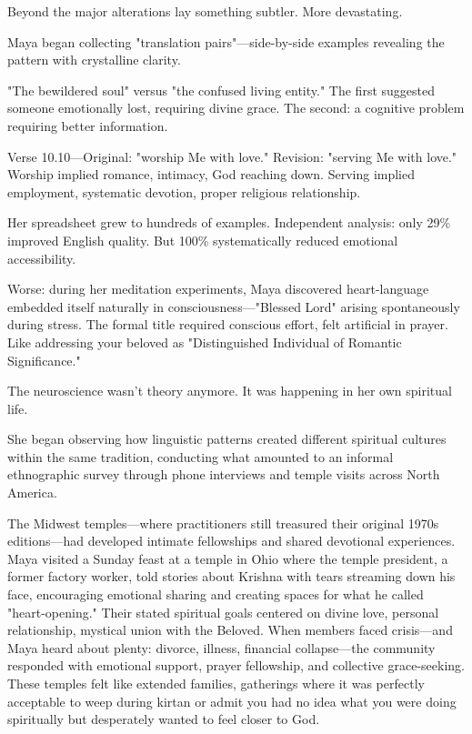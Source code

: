 \documentclass[12pt,twoside]{book}
\begin{document}
\normalfont\justifying
Beyond the major alterations lay something subtler. More devastating.

Maya began collecting "translation pairs"—side-by-side examples revealing the pattern with crystalline clarity.

"The bewildered soul" versus "the confused living entity." The first suggested someone emotionally lost, requiring divine grace. The second: a cognitive problem requiring better information.

Verse 10.10—Original: "worship Me with love." Revision: "serving Me with love." Worship implied romance, intimacy, God reaching down. Serving implied employment, systematic devotion, proper religious relationship.

Her spreadsheet grew to hundreds of examples. Independent analysis: only 29\% improved English quality. But 100\% systematically reduced emotional accessibility.

Worse: during her meditation experiments, Maya discovered heart-language embedded itself naturally in consciousness—"Blessed Lord" arising spontaneously during stress. The formal title required conscious effort, felt artificial in prayer. Like addressing your beloved as "Distinguished Individual of Romantic Significance."

The neuroscience wasn't theory anymore. It was happening in her own spiritual life.

She began observing how linguistic patterns created different spiritual cultures within the same tradition, conducting what amounted to an informal ethnographic survey through phone interviews and temple visits across North America.

The Midwest temples—where practitioners still treasured their original 1970s editions—had developed intimate fellowships and shared devotional experiences. Maya visited a Sunday feast at a temple in Ohio where the temple president, a former factory worker, told stories about Krishna with tears streaming down his face, encouraging emotional sharing and creating spaces for what he called "heart-opening." Their stated spiritual goals centered on divine love, personal relationship, mystical union with the Beloved. When members faced crisis—and Maya heard about plenty: divorce, illness, financial collapse—the community responded with emotional support, prayer fellowship, and collective grace-seeking. These temples felt like extended families, gatherings where it was perfectly acceptable to weep during kirtan or admit you had no idea what you were doing spiritually but desperately wanted to feel closer to God.
\end{document}
